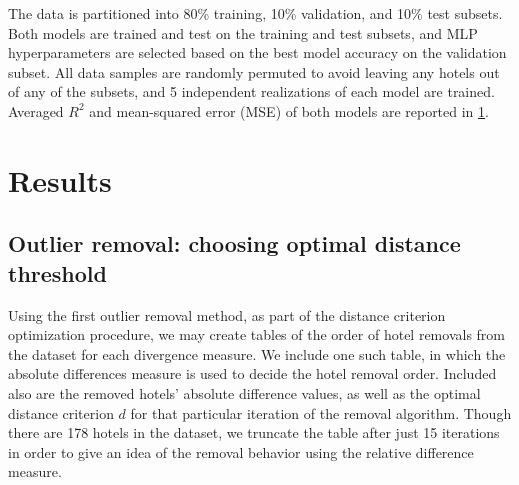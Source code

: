\documentclass[useAMS, referee, usenatbib]{biom}
\begin{document}
The data is partitioned into 80\% training, 10\% validation, and 10\% test subsets. Both models are trained and test on the training and test subsets, and MLP hyperparameters are selected based on the best model accuracy on the validation subset. All data samples are randomly permuted to avoid leaving any hotels out of any of the subsets, and 5 independent realizations of each model are trained. Averaged $R^2$ and mean-squared error (MSE) of both models are reported in \ref{s:results}.

\section{Results}
\label{s:results}

\subsection{Outlier removal: choosing optimal distance threshold}

Using the first outlier removal method, as part of the distance criterion optimization procedure, we may create tables of the order of hotel removals from the dataset for each divergence measure. We include one such table, in which the absolute differences measure is used to decide the hotel removal order. Included also are the removed hotels' absolute difference values, as well as the optimal distance criterion $d$ for that particular iteration of the removal algorithm. Though there are 178 hotels in the dataset, we truncate the table after just 15 iterations in order to give an idea of the removal behavior using the relative difference measure.
\end{document}
